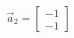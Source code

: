 \documentclass[preview]{standalone}
\begin{document}
\begin{align*}
\vec{a}_2=\begin{bmatrix} -1 \\ -1 \end{bmatrix}
\end{align*}
\end{document}
